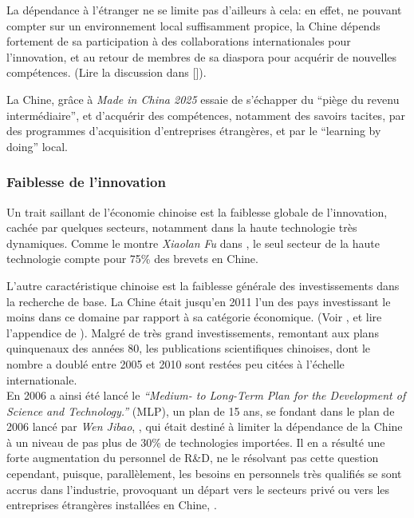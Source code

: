 \documentclass[a4paper]{article}
\begin{document}
La dépendance à l’étranger ne se limite pas d’ailleurs à cela: en effet, ne
pouvant compter sur un environnement local suffisamment propice, la Chine
dépends fortement de sa participation à des collaborations internationales pour
l’innovation, et au retour de membres de sa diaspora pour acquérir de nouvelles
compétences. (Lire la discussion dans [\cite{xiaolan15_chinas}]).

La Chine, grâce à \emph{Made in China 2025} essaie de s’échapper du “piège du revenu
intermédiaire”, et d’acquérir des compétences, notamment des savoirs tacites,
par des programmes d’acquisition d’entreprises étrangères, et par le “learning
by doing” local.

\subsubsection{Faiblesse de l’innovation}
\label{sec:orga58cd43}
Un trait saillant de l’économie chinoise est la faiblesse globale de
l’innovation, cachée par quelques secteurs, notamment dans la haute technologie
très dynamiques. Comme le montre \emph{Xiaolan Fu} dans \cite{xiaolan15_chinas}, le
seul secteur de la haute technologie compte pour 75\% des brevets en Chine.

L’autre caractéristique chinoise est la faiblesse générale des investissements
dans la recherche de base. La Chine était jusqu’en 2011 l’un des pays
investissant le moins dans ce domaine par rapport à sa catégorie économique.
(Voir \cite{xiaolan15_chinas}, et lire l’appendice de \cite{simon09_chinas}). Malgré
de très grand investissements, remontant aux plans quinquenaux des années 80,
les publications scientifiques chinoises, dont le nombre a doublé entre 2005 et
2010 sont restées peu citées à l’échelle internationale.\\

En 2006 a ainsi été lancé le \emph{“Medium- to Long-Term Plan for the Development of
Science and Technology.”} (MLP), un plan de 15 ans, se fondant dans le plan de
2006 lancé par \emph{Wen Jibao}, \cite{cao06_chinas_scien_techn_plan}, qui était
destiné à limiter la dépendance de la Chine à un niveau de pas plus de 30\% de
technologies importées. Il en a résulté une forte augmentation du personnel de
R\&D, ne le résolvant pas cette question cependant, puisque, parallèlement, les
besoins en personnels très qualifiés se sont accrus dans l’industrie, provoquant
un départ vers le secteurs privé ou vers les entreprises étrangères installées
en Chine, \cite{simon09_chinas}.
\end{document}
